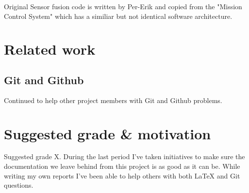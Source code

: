 Original Sensor fusion code is written by Per-Erik and copied from the "Mission
Control System" which has a similiar but not identical software architecture.

\section{Related work}

\subsection{Git and Github}
Continued to help other project members with Git and Github problems.

\section{Suggested grade \& motivation}
Suggested grade X. During the last period I've taken initiatives to make sure
the documentation we leave behind from this project is as good as it can be.
While writing my own reports I've been able to help others with both LaTeX and
Git questions.
